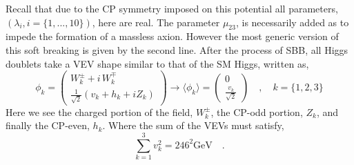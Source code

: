 Recall that due to the CP symmetry imposed on this potential all parameters, $(\lambda_i,i=\{1,...,10\})$, here are real.
%
The parameter $\mu_{23}$, is necessarily added as to impede the formation of a massless axion. 
%
However the most generic version of this soft breaking is given by the second line.  
%
After the process of SBB, all Higgs doublets take a VEV shape similar to that of the SM Higgs, written as, 
%
\begin{equation}
\phi_k = 
\begin{pmatrix}
W_k^\pm + i \, W_k^\mp \\ 
\frac{1}{\sqrt{2}}\left( v_k + h_k + i Z_k \right)
\end{pmatrix}  \rightarrow \langle \phi_k \rangle = \begin{pmatrix}
0 \\ 
\frac{v_k}{\sqrt{2}}
\end{pmatrix} \quad , \quad k=\{ 1,2,3\} 
\label{shame}
\end{equation} 
Here we see the charged portion of the field, $W_k^\pm$, the CP-odd portion, $Z_k$, and finally the CP-even, $h_k$. 
%
Where the sum of the VEVs must satisfy, 
\begin{equation}
\label{eq:VEV_Condition}
\sum_{k=1}^3 v_k^2 = 246^2 \text{GeV} \quad . 
\end{equation}

